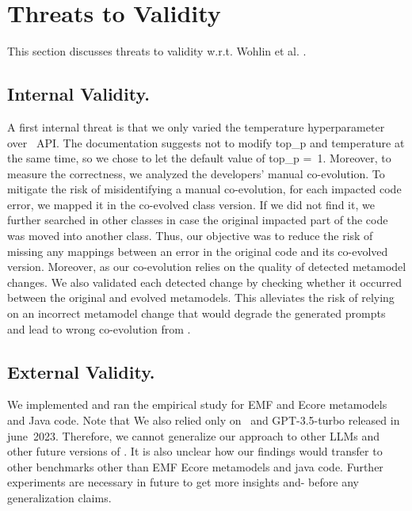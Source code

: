 \section{Threats to Validity}
This section discusses threats to validity w.r.t. Wohlin et al. \cite{wohlin2012experimentation}.

\subsection{Internal Validity.} 

A first internal threat is that we only varied the temperature hyperparameter over \LLM~API. The documentation suggests not to modify top\_p and temperature at the same time, so we chose to let the default value of top\_p =~1. 
Moreover, to measure the correctness, we analyzed the developers' manual co-evolution.
To mitigate the risk of misidentifying a manual co-evolution, for each impacted code error, we mapped it in the co-evolved class version. If we did not find it, we further searched in other classes in case the original impacted part of the code was moved into another class. Thus, our objective was to reduce the risk of missing any mappings between an error in the original code and its co-evolved version. Moreover, as our co-evolution relies on the quality of detected metamodel changes. We also validated each detected change by checking whether it occurred between the original and evolved metamodels. This alleviates the risk of relying on an incorrect metamodel change that would degrade the generated prompts and lead to wrong co-evolution from \LLM. 

\subsection{External Validity.}

We implemented and ran the empirical study for EMF and Ecore metamodels and Java code. Note that  
We also relied only on \LLM~and GPT-3.5-turbo released in june~2023. 
Therefore, we cannot generalize our approach to other LLMs and other future versions of \LLM. It is also unclear how our findings would transfer to other benchmarks other than EMF Ecore metamodels and java code. Further experiments are necessary in future to get more insights and- before any generalization claims.  


